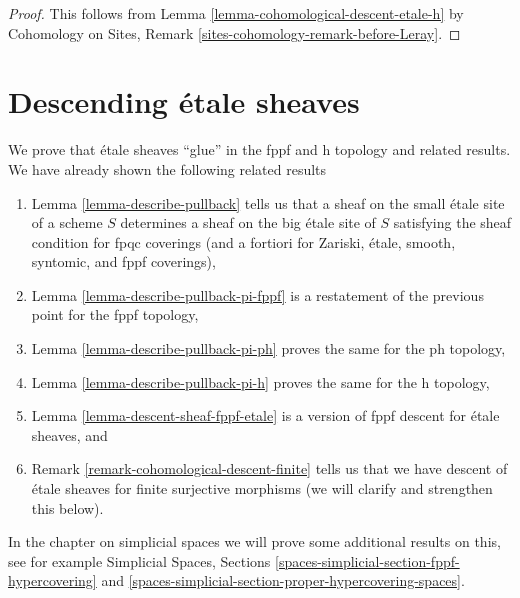 \begin{proof}
This follows from Lemma \ref{lemma-cohomological-descent-etale-h}
by Cohomology on Sites, Remark \ref{sites-cohomology-remark-before-Leray}.
\end{proof}











\section{Descending \'etale sheaves}
\label{section-glueing-etale}

\noindent
We prove that \'etale sheaves ``glue'' in the fppf and h topology
and related results. We have already shown the following related
results
\begin{enumerate}
\item Lemma \ref{lemma-describe-pullback} tells us that a sheaf
on the small \'etale site of a scheme $S$ determines a sheaf on the
big \'etale site of $S$ satisfying the sheaf condition for
fpqc coverings (and a fortiori for Zariski, \'etale, smooth, syntomic,
and fppf coverings),
\item Lemma \ref{lemma-describe-pullback-pi-fppf} is a restatement of
the previous point for the fppf topology,
\item Lemma \ref{lemma-describe-pullback-pi-ph} proves the same for the
ph topology,
\item Lemma \ref{lemma-describe-pullback-pi-h} proves the same for the
h topology,
\item Lemma \ref{lemma-descent-sheaf-fppf-etale} is a version of
fppf descent for \'etale sheaves, and
\item Remark \ref{remark-cohomological-descent-finite} tells us that
we have descent of \'etale sheaves for finite surjective morphisms
(we will clarify and strengthen this below).
\end{enumerate}
In the chapter on simplicial spaces we will prove some additional
results on this, see for example
Simplicial Spaces, Sections \ref{spaces-simplicial-section-fppf-hypercovering}
and \ref{spaces-simplicial-section-proper-hypercovering-spaces}.

